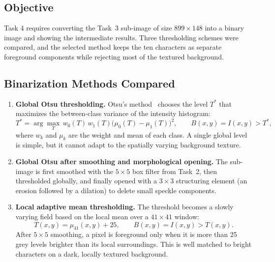 \subsection{Objective}

Task 4 requires converting the Task~3 sub-image of size $899\times148$ into a
binary image and showing the intermediate results.  Three thresholding schemes
were compared, and the selected method keeps the ten characters as separate
foreground components while rejecting most of the textured background.

\subsection{Binarization Methods Compared}

\begin{enumerate}
  \item \textbf{Global Otsu thresholding.}  Otsu's method~\cite{otsu1979} chooses the level
  $T^{*}$ that maximizes the between-class variance of the intensity
  histogram:
  \begin{equation}
    T^{*} = \arg\max_{T}\,
    w_{0}(T)\,w_{1}(T)\bigl(\mu_{0}(T)-\mu_{1}(T)\bigr)^{2},
    \qquad B(x,y) = I(x,y) > T^{*},
    \label{eq:task4-otsu}
  \end{equation}
  where $w_{k}$ and $\mu_{k}$ are the weight and mean of each class.  A single
  global level is simple, but it cannot adapt to the spatially varying
  background texture.

  \item \textbf{Global Otsu after smoothing and morphological opening.}  The
  sub-image is first smoothed with the $5\times5$ box filter from Task~2, then
  thresholded globally, and finally opened with a $3\times3$ structuring
  element (an erosion followed by a dilation) to delete small speckle
  components.

  \item \textbf{Local adaptive mean thresholding.}  The threshold becomes a
  slowly varying field based on the local mean over a $41\times41$ window:
  \begin{equation}
    T(x,y) = \mu_{41}(x,y) + 25,
    \qquad B(x,y) = I(x,y) > T(x,y).
    \label{eq:task4-adaptive}
  \end{equation}
  After $5\times5$ smoothing, a pixel is foreground only when it is more than
  25 grey levels brighter than its local surroundings.  This is well matched to
  bright characters on a dark, locally textured background.
\end{enumerate}

